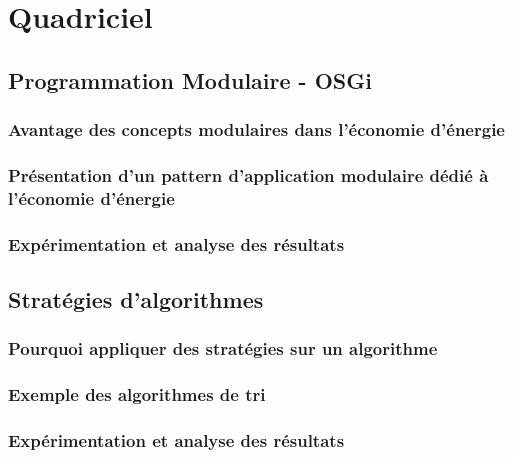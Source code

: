 \documentclass[a4paper, 11pt]{article}
\begin{document}
    \section{Quadriciel}
	\subsection{Programmation Modulaire - OSGi}
	    \subsubsection{Avantage des concepts modulaires dans l'économie d'énergie}
	    \subsubsection{Présentation d'un pattern d'application modulaire dédié à l'économie d'énergie}
	    \subsubsection{Expérimentation et analyse des résultats}
	\subsection{Stratégies d'algorithmes}
	    \subsubsection{Pourquoi appliquer des stratégies sur un algorithme}
	    \subsubsection{Exemple des algorithmes de tri}
	    \subsubsection{Expérimentation et analyse des résultats}
\end{document}
